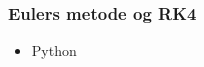 \begin{frame}
\frametitle{Eulers metode og RK4}
\begin{itemize}
\item Python
\end{itemize}
\end{frame}